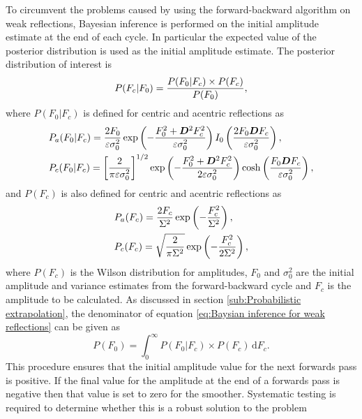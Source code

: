 To circumvent the problems caused by using the forward-backward algorithm on weak reflections, Bayesian inference is performed on the initial amplitude estimate at the end of each cycle.
In particular the expected value of the posterior distribution is used as the initial amplitude estimate.
The posterior distribution of interest is
\begin{equation}
	P(F_c | F_0) = \frac{P(F_0 | F_c) \times P(F_c)}{P(F_0)},
	\label{eq:Baysian inference for weak reflections}
\end{equation}
where $P(F_0 | F_c)$ is defined for centric and acentric reflections as
\begin{align}
    &P_a(F_0 | F_c) = \frac{2F_0}{\varepsilon \sigma_{0}^2} \exp \left(-\frac{F_0^2 + \boldsymbol{D}^2F_c^2}{\varepsilon \sigma_{0}^2}\right)I_0 \left(\frac{2F_0\boldsymbol{D}F_c}{\varepsilon \sigma_{0}^2}\right), \label{eq:Weak reflection likelihood function - acentric reflections} \\
    &P_c(F_0 | F_c) = \left[\frac{2}{\pi \varepsilon \sigma_{0}^2}\right]^{1/2} \exp \left(-\frac{F_0^2 + \boldsymbol{D}^2F_c^2}{2\varepsilon \sigma_{0}^2}\right) \cosh \left(\frac{F_0\boldsymbol{D}F_c}{\varepsilon \sigma_{0}^2}\right), \label{eq:Weak reflection likelihood function - centric reflections}
\end{align}
and $P(F_c)$ is also defined for centric and acentric reflections as
\begin{align}
    &P_a(F_c) = \frac{2F_c}{\Sigma^2} \exp \left(-\frac{F_c^2}{\Sigma^2}\right), \label{eq:Weak reflection prior distribution - acentric reflections} \\
    &P_c(F_c) = \sqrt{\frac{2}{\pi \Sigma^2}} \exp \left(-\frac{F_c^2}{2\Sigma^2}\right), \label{eq:Weak reflection prior distribution - centric reflections}
\end{align}
where $P(F_c)$ is the Wilson distribution for amplitudes, $F_0$ and $\sigma_{0}^2$ are the initial amplitude and variance estimates from the forward-backward cycle and $F_c$ is the amplitude to be calculated.
As discussed in section \ref{sub:Probabilistic extrapolation}, the denominator of equation \ref{eq:Baysian inference for weak reflections} can be given as
\begin{equation}
	P(F_0) = \int_0^{\infty} P(F_0 | F_c) \times P(F_c)\, \mathrm{d}F_c.
\end{equation}
This procedure ensures that the initial amplitude value for the next forwards pass is positive.
If the final value for the amplitude at the end of a forwards pass is negative then that value is set to zero for the smoother.
Systematic testing is required to determine whether this is a robust solution to the problem
